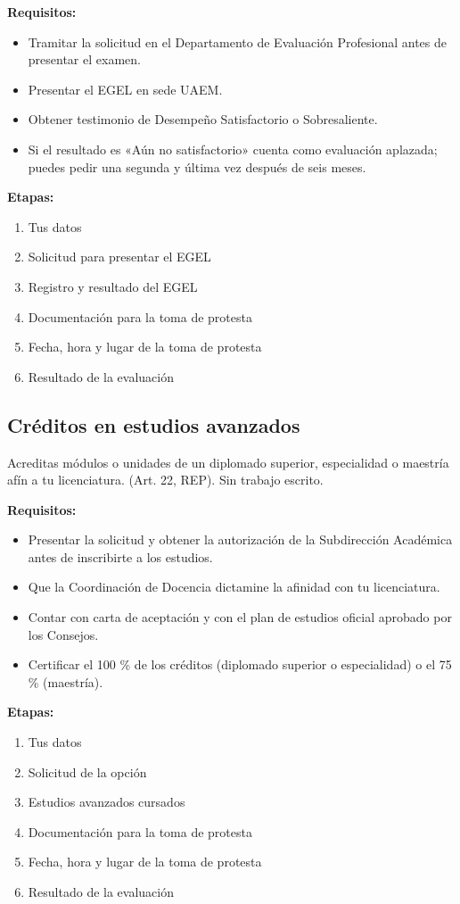 \textbf{Requisitos:}
\begin{itemize}
  \item Tramitar la solicitud en el Departamento de Evaluación Profesional antes de presentar el examen.
  \item Presentar el EGEL en sede UAEM.
  \item Obtener testimonio de Desempeño Satisfactorio o Sobresaliente.
  \item Si el resultado es «Aún no satisfactorio» cuenta como evaluación aplazada; puedes pedir una segunda y última vez después de seis meses.
\end{itemize}
\textbf{Etapas:}
\begin{enumerate}
  \item Tus datos
  \item Solicitud para presentar el EGEL
  \item Registro y resultado del EGEL
  \item Documentación para la toma de protesta
  \item Fecha, hora y lugar de la toma de protesta
  \item Resultado de la evaluación
\end{enumerate}
\subsection{Créditos en estudios avanzados}
Acreditas módulos o unidades de un diplomado superior, especialidad o maestría afín a tu licenciatura. (Art. 22, REP). Sin trabajo escrito.

\textbf{Requisitos:}
\begin{itemize}
  \item Presentar la solicitud y obtener la autorización de la Subdirección Académica antes de inscribirte a los estudios.
  \item Que la Coordinación de Docencia dictamine la afinidad con tu licenciatura.
  \item Contar con carta de aceptación y con el plan de estudios oficial aprobado por los Consejos.
  \item Certificar el 100 \% de los créditos (diplomado superior o especialidad) o el 75 \% (maestría).
\end{itemize}
\textbf{Etapas:}
\begin{enumerate}
  \item Tus datos
  \item Solicitud de la opción
  \item Estudios avanzados cursados
  \item Documentación para la toma de protesta
  \item Fecha, hora y lugar de la toma de protesta
  \item Resultado de la evaluación
\end{enumerate}
